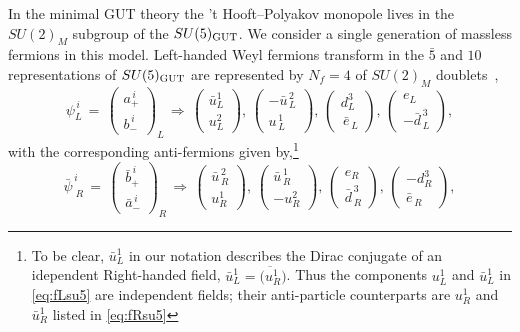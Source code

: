 \documentclass[a4paper,11pt]{article}
\begin{document}
In the minimal GUT theory the 't Hooft--Polyakov monopole lives in the $SU(2)_M$ subgroup of the $SU(5)_{\rm GUT}$.
We consider a single generation of massless fermions in this model.
Left-handed Weyl fermions transform in the $\bar{5}$ and $10$ representations of $SU(5)_{\rm GUT}$ are represented by $N_f=4$ of $SU(2)_M$ 
doublets~\cite{Rubakov:1988aq},
\begin{equation}
\label{eq:fLsu5}
\psi_L^{\,i}\,=\, \begin{pmatrix}
a_{+}^{\,i} \\
b_{-}^{\,i}
\end{pmatrix}_L\,\Rightarrow\,
\begin{pmatrix}
\bar{u}^{1}_{L} \\
u^2_{L}
\end{pmatrix},\,
\begin{pmatrix}
-\bar{u}^{\,2}_{\,L} \\
u^{\,1}_{\,L}
\end{pmatrix},\,
\begin{pmatrix}
d^{3}_{L} \\
\,\bar{e}_{\,L}
\end{pmatrix},\,
\begin{pmatrix}
e_{L} \\
-\bar{d}^{\,3}_{\,L}
\end{pmatrix},
\end{equation}
with the corresponding anti-fermions given by,\footnote{To be clear, $\bar{u}^{1}_{L}$ in our notation describes the Dirac conjugate of an idependent Right-handed field, $\bar{u}^{1}_{L}=\overline{({u}^{1}_{R}})$. Thus the components $u_L^1$ and $\bar{u}^{1}_{L}$ in \eqref{eq:fLsu5} are independent fields; their anti-particle counterparts are $u_R^1$ and $\bar{u}^{1}_{R}$  listed in \eqref{eq:fRsu5} }
\begin{equation}
\label{eq:fRsu5}
\bar\psi_{\,\,R}^{\,i}\,=\, \begin{pmatrix}
\bar{b}_{+}^{\,i}  \\
\bar{a}_{-}^{\,i}
\end{pmatrix}_R
\,\Rightarrow\,
 \begin{pmatrix}
\bar{u}^{\,2}_{\,R} \\
u^{1}_{R}
\end{pmatrix},\, 
 \begin{pmatrix}
\bar{u}^{\,1}_{\,R} \\
-u^{2}_{R}
\end{pmatrix},\,
\begin{pmatrix}
e_{R} \\
\bar{d}^{\,3}_{\,R}
\end{pmatrix},\,
\begin{pmatrix}
-d^3_{R} \\
\bar{e}_{\,R}
\end{pmatrix},
\end{equation}
\end{document}
